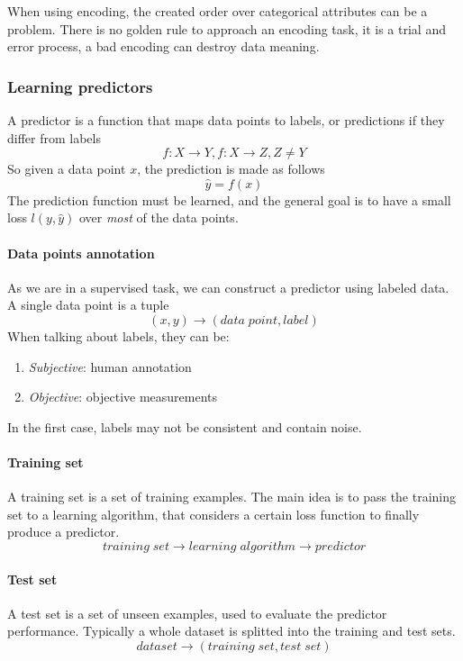 \begin{remark}
    When using encoding, the created order over categorical attributes can be 
    a problem.
    There is no golden rule to approach an encoding task, it is a trial and error process, 
    a bad encoding can destroy data meaning.
\end{remark}

\subsubsection{Learning predictors}
A predictor is a function that maps data points to labels, or predictions 
if they differ from labels
$$f : X \longrightarrow Y, f: X \longrightarrow Z, Z \neq Y$$
So given a data point $x$, the prediction is made as follows
$$\hat{y} = f(x)$$
The prediction function must be learned, and the general goal is 
to have a small loss $l(y, \hat{y})$ over \emph{most} of the data points.

\paragraph{Data points annotation}
As we are in a supervised task, we can construct a predictor using labeled data.
A single data point is a tuple
$$(x, y) \longrightarrow (\mathit{data\;point}, \mathit{label})$$
When talking about labels, they can be:
\begin{enumerate}
    \item \emph{Subjective}: human annotation
    \item \emph{Objective}: objective measurements
\end{enumerate}
In the first case, labels may not be consistent and contain noise.

\paragraph{Training set}
A training set is a set of training examples.
The main idea is to pass the training set to a learning algorithm, 
that considers a certain loss function to finally produce 
a predictor.
$$\mathit{training\;set} \longrightarrow \mathit{learning\;algorithm}
\longrightarrow \mathit{predictor}$$

\paragraph{Test set}
A test set is a set of unseen examples, used to evaluate the predictor 
performance. Typically a whole dataset is splitted into the training and test sets.
$$\mathit{dataset} \longrightarrow (\mathit{training\;set}, \mathit{test\;set})$$

